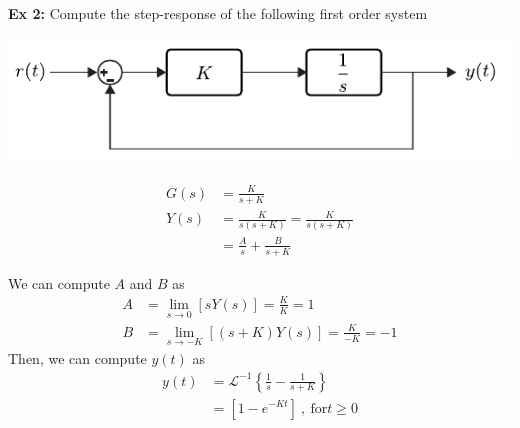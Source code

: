 \documentclass[twoside]{article}
\begin{document}
     \vspace{12pt}
     
     \textbf{Ex 2:} Compute the step-response of the following first order system
     
         \begin{minipage}[h]{0.7\linewidth}
    \begin{center}
      \includegraphics[width=1\textwidth]{firstex}
    \end{center}
  \end{minipage}
    \begin{minipage}[h]{0.3\linewidth}
    \begin{center}
      \begin{align*}
	G(s) &= \frac{K}{s+K} \
	\\
	Y(s) &= \frac{K}{s (s+K)} = \frac{K}{s (s+K)}
	\\
	&= \frac{A}{s} + \frac{B}{s+K}
      \end{align*}
    \end{center}
  \end{minipage}
  
  We can compute $A$ and $B$ as
  \begin{align*}
  	A &= \lim_{s \to 0} \left[  s Y(s) \right] = \frac{K}{K} = 1
	\\
	B &= \lim_{s \to -K} \left[  (s+K) Y(s) \right] = \frac{K}{-K} = -1
   \end{align*}
%
Then, we can compute $y(t)$ as
%
  \begin{align*}
y(t) &= \mathcal{L}^{-1} \left\lbrace \frac{1}{s} - \frac{1}{s+K} \right\rbrace  
\\
&= \left[ 1 - e^{-K t} \right] \ , \ \mathrm{for} t \geq 0
\end{align*}
\end{document}
